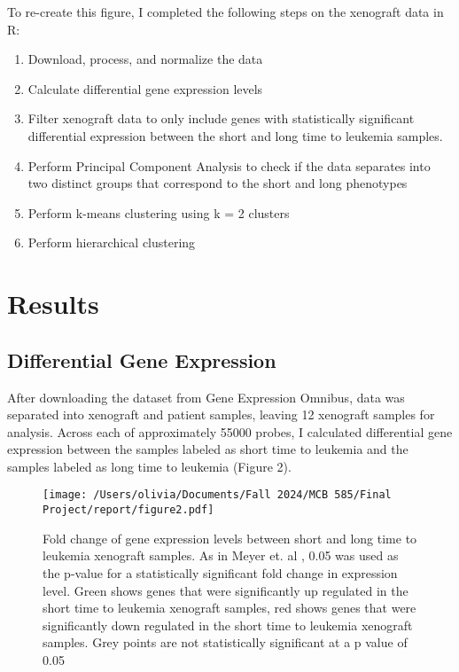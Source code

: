 \documentclass{article}
\begin{document}
To re-create this figure, I completed the following steps on the xenograft data in R:
\begin{enumerate}
	\item Download, process, and normalize the data
	\item Calculate differential gene expression levels
	\item Filter xenograft data to only include genes with statistically significant differential expression between the short and long time to leukemia samples. 
	\item Perform Principal Component Analysis to check if the data separates into two distinct groups that correspond to the short and long phenotypes
	\item Perform k-means clustering using k = 2 clusters
	\item Perform hierarchical clustering
\end{enumerate}


\section{Results}

\subsection{Differential Gene Expression}
After downloading the dataset from Gene Expression Omnibus, data was separated into xenograft and patient samples, leaving 12 xenograft samples for analysis. Across each of approximately 55000 probes, I calculated differential gene expression between the samples labeled as short time to leukemia and the samples labeled as long time to leukemia (Figure 2). 

\begin{figure}[H]
    \centering
    \texttt{[image: /Users/olivia/Documents/Fall 2024/MCB 585/Final Project/report/figure2.pdf]}
    \caption{Fold change of gene expression levels between short and long time to leukemia xenograft samples. As in Meyer et. al \cite{data}, 0.05 was used as the p-value for a statistically significant fold change in expression level. Green shows genes that were significantly up regulated in the short time to leukemia xenograft samples, red shows genes that were significantly down regulated in the short time to leukemia xenograft samples. Grey points are not statistically significant at a p value of 0.05}
    \label{fig:2}
\end{figure}
\end{document}
